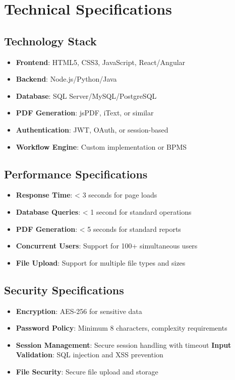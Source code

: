 \documentclass[12pt,a4paper]{article}
\begin{document}
\section{Technical Specifications}

\subsection{Technology Stack}
\begin{itemize}
    \item \textbf{Frontend}: HTML5, CSS3, JavaScript, React/Angular
    \item \textbf{Backend}: Node.js/Python/Java
    \item \textbf{Database}: SQL Server/MySQL/PostgreSQL
    \item \textbf{PDF Generation}: jsPDF, iText, or similar
    \item \textbf{Authentication}: JWT, OAuth, or session-based
    \item \textbf{Workflow Engine}: Custom implementation or BPMS
\end{itemize}

\subsection{Performance Specifications}
\begin{itemize}
    \item \textbf{Response Time}: < 3 seconds for page loads
    \item \textbf{Database Queries}: < 1 second for standard operations
    \item \textbf{PDF Generation}: < 5 seconds for standard reports
    \item \textbf{Concurrent Users}: Support for 100+ simultaneous users
    \item \textbf{File Upload}: Support for multiple file types and sizes
\end{itemize}

\subsection{Security Specifications}
\begin{itemize}
    \item \textbf{Encryption}: AES-256 for sensitive data
    \item \textbf{Password Policy}: Minimum 8 characters, complexity requirements
    \item \textbf{Session Management}: Secure session handling with timeout
    \textbf{Input Validation}: SQL injection and XSS prevention
    \item \textbf{File Security}: Secure file upload and storage
\end{itemize}
\end{document}
